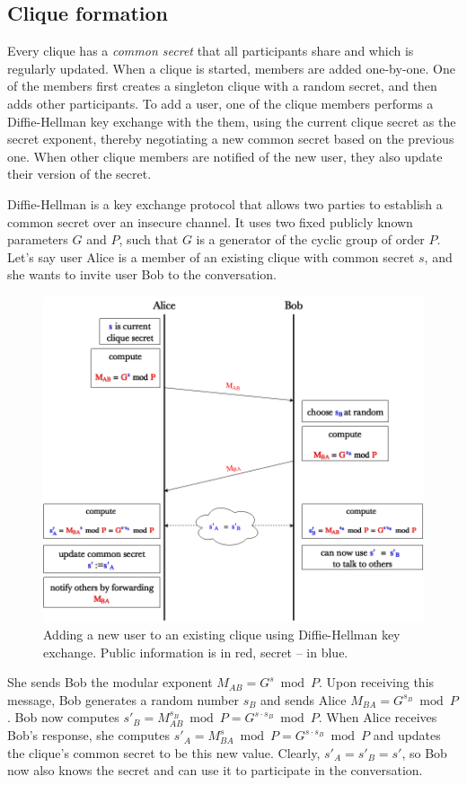 \documentclass[a4paper, 12pt]{report}
\begin{document}
\subsection{Clique formation}
\label{subsec:prep.formation}
Every clique has a \emph{common secret} that all participants share and which is regularly updated. When a clique is started, members are added one-by-one. One of the members first creates a singleton clique with a random secret, and then adds other participants. To add a user, one of the clique members performs a Diffie-Hellman key exchange \cite{diffie1976new} with the them, using the current clique secret as the secret exponent, thereby negotiating a new common secret based on the previous one. When other clique members are notified of the new user, they also update their version of the secret. 

Diffie-Hellman is a key exchange protocol that allows two parties to establish a common secret over an insecure channel. It uses two fixed publicly known parameters $G$ and $P$, such that $G$ is a generator of the cyclic group of order $P$. Let's say user Alice is a member of an existing clique with common secret $s$, and she wants to invite user Bob to the conversation. 
\begin{figure}[h]
    \captionsetup{width=0.8\textwidth}
    \centering
    \includegraphics[width = 0.85 \linewidth]{pics/DH.png}
    \caption{Adding a new user to an existing clique using Diffie-Hellman key exchange. Public information is in {\color{red}red}, secret -- in {\color{blue}blue}.}
    \label{fig:DH}
\end{figure}

She sends Bob the modular exponent $M_{AB} = G^{s} \bmod P$. Upon receiving this message, Bob generates a random number $s_B$ and sends Alice $M_{BA} = G^{s_B} \bmod P$. Bob now computes $s'_B = M_{AB}^{s_B} \bmod P = G^{s \cdot s_B} \bmod P$. When Alice receives Bob's response, she computes $s'_A = M_{BA}^{s} \bmod P = G^{s \cdot s_B} \bmod P$ and updates the clique's common secret to be this new value. Clearly, $s'_A = s'_B = s'$, so Bob now also knows the secret and can use it to participate in the conversation. \\
\end{document}
